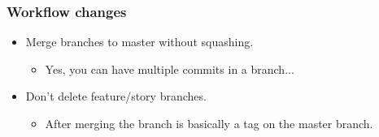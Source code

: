 \begin{frame}
	\frametitle{Workflow changes}
	\begin{itemize}[<+-| highlight@+>]
		\item Merge branches to master without squashing.
		\begin{itemize}[<+-| highlight@+>]
			\item Yes, you can have multiple commits in a branch...
		\end{itemize}
		\item Don't delete feature/story branches.
		\begin{itemize}[<+-| highlight@+>]
			\item After merging the branch is basically a tag on the master branch.
		\end{itemize}
	\end{itemize}
\end{frame}

